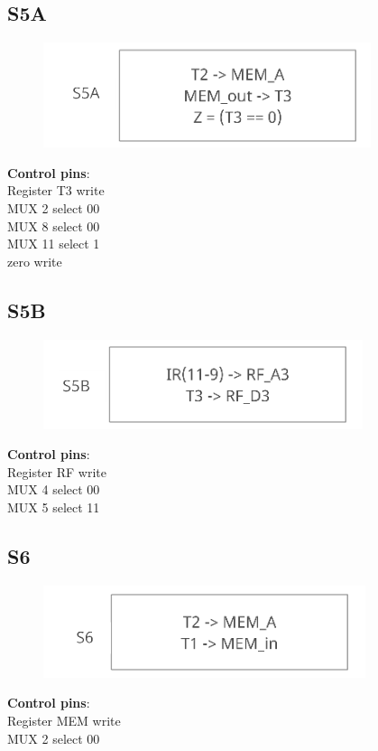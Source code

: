 \documentclass[11pt, fleqn]{article}
\begin{document}
\subsection*{\centering S5A}
\begin{figure}[H]
    \centering
    \includegraphics{DataPath/DataPath_S5A.PNG}
\end{figure}
\begin{center}
\textbf{Control pins}: \\
Register T3 write \\
MUX 2 select 00 \\
MUX 8 select 00 \\
MUX 11 select 1 \\
zero write \\
\end{center}

\bigskip

\subsection*{\centering S5B}
\begin{figure}[H]
    \centering
    \includegraphics{DataPath/DataPath_S5B.PNG}
\end{figure}
\begin{center}
\textbf{Control pins}: \\
Register RF write \\
MUX 4 select 00 \\
MUX 5 select 11 \\
\end{center}

\bigskip

\subsection*{\centering S6}
\begin{figure}[H]
    \centering
    \includegraphics{DataPath/DataPath_S6.PNG}
\end{figure}
\begin{center}
\textbf{Control pins}: \\
Register MEM write \\
MUX 2 select 00 \\
\end{center}
\end{document}
